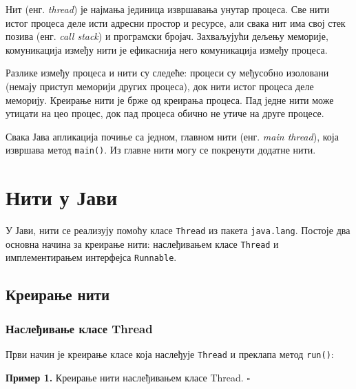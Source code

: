 Нит (енг. \textit{thread}) је најмања јединица извршавања унутар процеса. Све нити истог процеса деле исти адресни простор и ресурсе, али свака нит има свој стек позива (енг. \textit{call stack}) и програмски бројач. Захваљујући дељењу меморије, комуникација између нити је ефикаснија него комуникација између процеса.

Разлике између процеса и нити су следеће: процеси су међусобно изоловани (немају приступ меморији других процеса), док нити истог процеса деле меморију. Креирање нити је брже од креирања процеса. Пад једне нити може утицати на цео процес, док пад процеса обично не утиче на друге процесе.

Свака Јава апликација почиње са једном, главном нити (енг. \textit{main thread}), која извршава метод \texttt{main()}. Из главне нити могу се покренути додатне нити.


\section{Нити у Јави}

У Јави, нити се реализују помоћу класе \texttt{Thread} из пакета \texttt{java.lang}. Постоје два основна начина за креирање нити: наслеђивањем класе \texttt{Thread} и имплементирањем интерфејса \texttt{Runnable}.


\subsection{Креирање нити}

\subsubsection{Наслеђивање класе Thread}

Први начин је креирање класе која наслеђује \texttt{Thread} и преклапа метод \texttt{run()}:


\bigskip

\noindent \textbf{Пример 1.} Креирање нити наслеђивањем класе Thread. $\square$

\medskip


